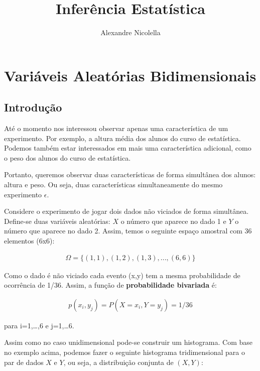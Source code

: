\documentclass[
  letterpaper,
  DIV=11,
  numbers=noendperiod]{scrartcl}
\title{Inferência Estatística}
\author{Alexandre Nicolella}
\date{}
\renewcommand*\contentsname{Table of contents}
\newcommand\contentsname{Table of contents}
\begin{document}
\maketitle

\renewcommand*\contentsname{Table of contents}
{
\hypersetup{linkcolor=}
\setcounter{tocdepth}{3}
\tableofcontents
}

\section{Variáveis Aleatórias
Bidimensionais}\label{variuxe1veis-aleatuxf3rias-bidimensionais}

\subsection{Introdução}\label{introduuxe7uxe3o}

Até o momento nos interessou observar apenas uma característica de um
experimento. Por exemplo, a altura média dos alunos do curso de
estatística. Podemos também estar interessados em mais uma
característica adicional, como o peso dos alunos do curso de
estatística.

Portanto, queremos observar duas características de forma simultânea dos
alunos: altura e peso. Ou seja, duas características simultaneamente do
mesmo experimento \(\epsilon\).

Considere o experimento de jogar dois dados não viciados de forma
simultânea. Define-se duas variáveis aleatórias: \(X\) o número que
aparece no dado 1 e \(Y\) o número que aparece no dado 2. Assim, temos o
seguinte espaço amostral com 36 elementos (6x6):

\[\begin{array}{ccc}
\Omega = { \{(1,1),(1,2),(1,3),...,(6,6)\} }
\end{array}\]

Como o dado é não viciado cada evento (x,y) tem a mesma probabilidade de
ocorrência de 1/36. Assim, a função de \textbf{probabilidade bivariada}
é:

\[\begin{array}{ccc}
p(x_{i},y_{j})=P(X=x_{i},Y=y_{j})=1/36 
\end{array}\]

para i=1,\ldots,6 e j=1,\ldots6.

Assim como no caso unidimensional pode-se construir um histograma. Com
base no exemplo acima, podemos fazer o seguinte histograma
tridimensional para o par de dados \(X\) e \(Y\), ou seja, a
distribuição conjunta de \((X,Y)\):
\end{document}
